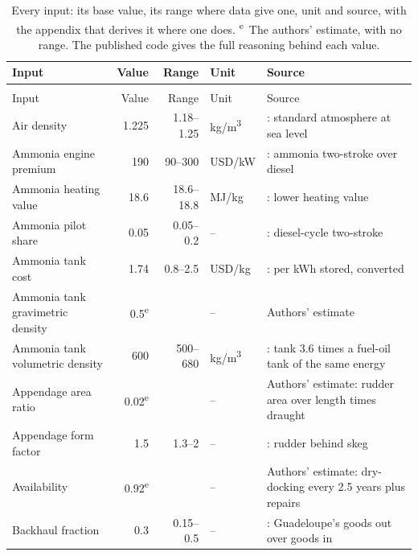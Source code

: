 \begin{longtable}{@{}>{\raggedright\arraybackslash}p{3.4cm}rr>{\raggedright\arraybackslash}p{1.4cm}>{\raggedright\arraybackslash}p{5.8cm}@{}}
\caption{Every input: its base value, its range where data give one, unit and source, with the appendix that derives it where one does. \textsuperscript{e}~The authors' estimate, with no range. The published code gives the full reasoning behind each value.}
\label{tab:inputs}\\
\toprule
Input & Value & Range & Unit & Source \\
\midrule
\endfirsthead
\multicolumn{5}{@{}l}{\cref{tab:inputs} (continued)}\\
\toprule
Input & Value & Range & Unit & Source \\
\midrule
\endhead
\bottomrule
\endfoot
Air density & \num{1.225} & \num{1.18}--\num{1.25} & kg/m\textsuperscript{3} & \citet{vandervlugt2019}: standard atmosphere at sea level \\
Ammonia engine premium & \num{190} & \num{90}--\num{300} & USD/kW & \citet[Table B21]{lrumas2020}: ammonia two-stroke over diesel \\
Ammonia heating value & \num{18.6} & \num{18.6}--\num{18.8} & MJ/kg & \citet[Table 3]{irena2021ship}: lower heating value \\
Ammonia pilot share & \num{0.05} & \num{0.05}--\num{0.2} & -- & \citet[p. 53]{mmmczcs2021fuel}: diesel-cycle two-stroke \\
Ammonia tank cost & \num{1.74} & \num{0.8}--\num{2.5} & USD/kg & \citet[Table 3]{kanchiralla2022}: per kWh stored, converted \\
Ammonia tank gravimetric density & \num{0.5}\textsuperscript{e} &  & -- & Authors' estimate \\
Ammonia tank volumetric density & \num{600} & \num{500}--\num{680} & kg/m\textsuperscript{3} & \citet[p. 55]{mmmczcs2021fuel}: tank 3.6 times a fuel-oil tank of the same energy \\
Appendage area ratio & \num{0.02}\textsuperscript{e} &  & -- & Authors' estimate: rudder area over length times draught \\
Appendage form factor & \num{1.5} & \num{1.3}--\num{2} & -- & \citet{holtrop1982}: rudder behind skeg \\
Availability & \num{0.92}\textsuperscript{e} &  & -- & Authors' estimate: dry-docking every 2.5 years plus repairs \\
Backhaul fraction & \num{0.3} & \num{0.15}--\num{0.5} & -- & \citet[p. 133]{iedom2025guadeloupe}: Guadeloupe's goods out over goods in \\

\end{longtable}
